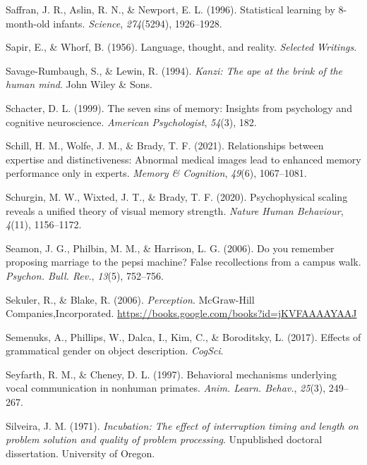\documentclass[
]{krantz}
\newlength{\cslhangindent}
\newenvironment{CSLReferences}[2] %
 {\begin{list}{}{%
  \setlength{\itemindent}{0pt}
  \setlength{\leftmargin}{0pt}
  \setlength{\parsep}{0pt}
  \ifodd #1
   \setlength{\leftmargin}{\cslhangindent}
   \setlength{\itemindent}{-1\cslhangindent}
  \fi
  \setlength{\itemsep}{#2\baselineskip}}}
 {\end{list}}
\begin{document}
\begin{CSLReferences}{1}{0}
Saffran, J. R., Aslin, R. N., \& Newport, E. L. (1996). Statistical learning by 8-month-old infants. \emph{Science}, \emph{274}(5294), 1926--1928.

Sapir, E., \& Whorf, B. (1956). Language, thought, and reality. \emph{Selected Writings}.

Savage-Rumbaugh, S., \& Lewin, R. (1994). \emph{Kanzi: The ape at the brink of the human mind}. John Wiley \& Sons.

Schacter, D. L. (1999). The seven sins of memory: Insights from psychology and cognitive neuroscience. \emph{American Psychologist}, \emph{54}(3), 182.

Schill, H. M., Wolfe, J. M., \& Brady, T. F. (2021). Relationships between expertise and distinctiveness: Abnormal medical images lead to enhanced memory performance only in experts. \emph{Memory \& Cognition}, \emph{49}(6), 1067--1081.

Schurgin, M. W., Wixted, J. T., \& Brady, T. F. (2020). Psychophysical scaling reveals a unified theory of visual memory strength. \emph{Nature Human Behaviour}, \emph{4}(11), 1156--1172.

Seamon, J. G., Philbin, M. M., \& Harrison, L. G. (2006). Do you remember proposing marriage to the pepsi machine? False recollections from a campus walk. \emph{Psychon. Bull. Rev.}, \emph{13}(5), 752--756.

Sekuler, R., \& Blake, R. (2006). \emph{Perception}. McGraw-Hill Companies,Incorporated. \url{https://books.google.com/books?id=jKVFAAAAYAAJ}

Semenuks, A., Phillips, W., Dalca, I., Kim, C., \& Boroditsky, L. (2017). Effects of grammatical gender on object description. \emph{CogSci}.

Seyfarth, R. M., \& Cheney, D. L. (1997). Behavioral mechanisms underlying vocal communication in nonhuman primates. \emph{Anim. Learn. Behav.}, \emph{25}(3), 249--267.

Silveira, J. M. (1971). \emph{Incubation: The effect of interruption timing and length on problem solution and quality of problem processing}. Unpublished doctoral dissertation. University of Oregon.


\end{CSLReferences}
\end{document}
